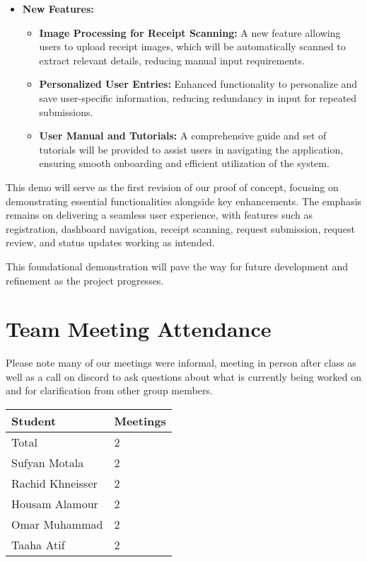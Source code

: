 \documentclass{article}
\begin{document}
\begin{itemize}
    
    \item \textbf{New Features:}
    \begin{itemize}
        \item \textbf{Image Processing for Receipt Scanning:} A new feature allowing users to upload receipt images, which will be automatically scanned to extract relevant details, reducing manual input requirements.
        \item \textbf{Personalized User Entries:} Enhanced functionality to personalize and save user-specific information, reducing redundancy in input for repeated submissions.
        \item \textbf{User Manual and Tutorials:} A comprehensive guide and set of tutorials will be provided to assist users in navigating the application, ensuring smooth onboarding and efficient utilization of the system.
    \end{itemize}
\end{itemize}

This demo will serve as the first revision of our proof of concept, focusing on demonstrating essential functionalities alongside key enhancements. The emphasis remains on delivering a seamless user experience, with features such as registration, dashboard navigation, receipt scanning, request submission, request review, and status updates working as intended. 

This foundational demonstration will pave the way for future development and refinement as the project progresses.


\section{Team Meeting Attendance}


Please note many of our meetings were informal, meeting in person after class as well as a call on discord to ask questions about what is currently being worked on and for clarification from other group members.
\begin{table}[H]
    \centering
    \begin{tabular}{ll}
    \toprule
    \textbf{Student} & \textbf{Meetings}\\
    \midrule
    Total & 2\\
    Sufyan Motala & 2\\
    Rachid Khneisser & 2\\
    Housam Alamour & 2\\
    Omar Muhammad & 2\\
    Taaha Atif & 2\\
    \bottomrule
    \end{tabular}
    \end{table}
\end{document}
